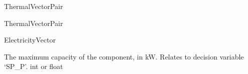 \documentclass[letterpaper,10pt,english]{sphinxmanual}
\begin{document}
\begin{fulllineitems}
\begin{fulllineitems}
\label{\detokenize{generated/tamos.production.Pump:tamos.production.Pump.element_1}}
\pysigstartsignatures
{}
\pysigstopsignatures
\sphinxAtStartPar
ThermalVectorPair

\end{fulllineitems}


\begin{fulllineitems}
\label{\detokenize{generated/tamos.production.Pump:tamos.production.Pump.element_2}}
\pysigstartsignatures
{}
\pysigstopsignatures
\sphinxAtStartPar
ThermalVectorPair

\end{fulllineitems}


\begin{fulllineitems}
\label{\detokenize{generated/tamos.production.Pump:tamos.production.Pump.energy_drive}}
\pysigstartsignatures
{}
\pysigstopsignatures
\sphinxAtStartPar
ElectricityVector

\end{fulllineitems}


\begin{fulllineitems}
\label{\detokenize{generated/tamos.production.Pump:tamos.production.Pump.given_sizing}}
\pysigstartsignatures
{}
\pysigstopsignatures
\sphinxAtStartPar
The maximum capacity of the component, in kW.
Relates to decision variable ‘SP\_P’.
int or float

\end{fulllineitems}



\end{fulllineitems}
\end{document}
